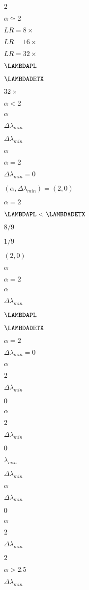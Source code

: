 $2$

$\alpha\simeq2$

$LR=8\times$

$LR=16\times$

$LR=32\times$

$\LAMBDAPL$

$\LAMBDADETX$

$32\times$

$\alpha < 2$

$\alpha$

$\Delta \lambda_{min}$

$\Delta \lambda_{min}$

$\alpha$

$\alpha=2$

$\Delta \lambda_{min} = 0$

$(\alpha, \Delta\lambda_{min}) = (2, 0)$

$\alpha=2$

$\LAMBDAPL < \LAMBDADETX$

$8/9$

$1/9$

$(2, 0)$

$\alpha$

$\alpha=2$

$\alpha$

$\Delta \lambda_{min}$

$\LAMBDAPL$

$\LAMBDADETX$

$\alpha=2$

$\Delta \lambda_{min} = 0$

$\alpha$

$2$

$\Delta \lambda_{min}$

$0$

$\alpha$

$2$

$\Delta\lambda_{min}$

$0$

$\lambda_{min}$

$\Delta\lambda_{min}$

$\alpha$

$\Delta \lambda_{min}$

$0$

$\alpha$

$2$

$\Delta \lambda_{min}$

$2$

$\alpha > 2.5$

$\Delta \lambda_{min}$

